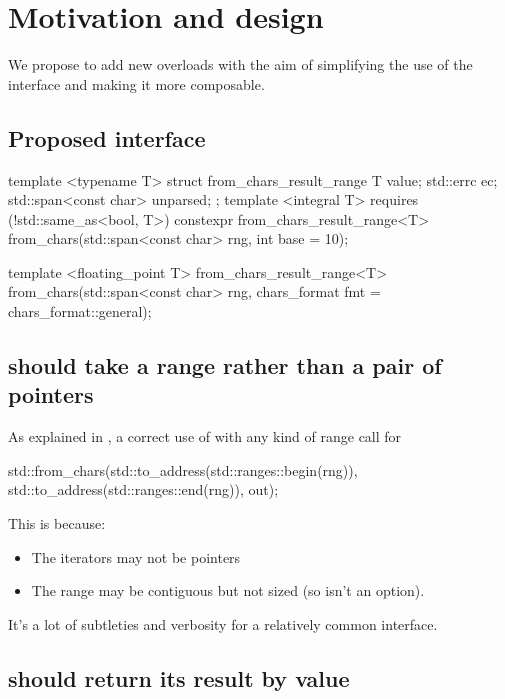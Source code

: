 \documentclass{wg21}
\begin{document}
\section{Motivation and design}

We propose to add new  overloads with the aim of simplifying the use of the interface and making it more composable.


\subsection{Proposed interface}

\begin{colorblock}
template <typename T>
struct from_chars_result_range {
    T value;
    std::errc ec;
    std::span<const char> unparsed;
};
template <integral T>
requires (!std::same_as<bool, T>)
constexpr from_chars_result_range<T> from_chars(std::span<const char> rng, int base = 10);

template <floating_point T>
from_chars_result_range<T> from_chars(std::span<const char> rng, chars_format fmt = chars_format::general);
\end{colorblock}


\subsection{ should take a range rather than a pair of pointers}

As explained in , a correct use of  with any kind of range call for

\begin{colorblock}
std::from_chars(std::to_address(std::ranges::begin(rng)), std::to_address(std::ranges::end(rng)), out);
\end{colorblock}

This is because:
\begin{itemize}
\item The iterators may not be pointers
\item The range may be contiguous but not sized (so  isn't an option).
\end{itemize}

It's a lot of subtleties and verbosity for a relatively common interface.

\subsection{ should return its result by value}
\end{document}

